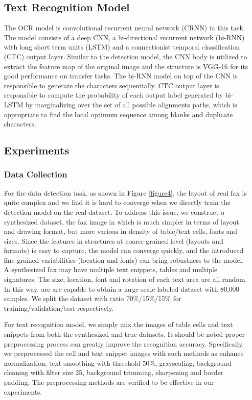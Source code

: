 \documentclass[sigconf]{acmart}
\begin{document}
\subsection{Text Recognition Model}
The OCR model is convolutional recurrent neural network (CRNN) \cite{shi2017end} in this task. The model consists of a deep CNN, a bi-directional recurrent network (bi-RNN) with long short term units (LSTM) and a connectionist temporal classification (CTC) \cite{graves2006connectionist} output layer. Similar to the detection model, the CNN body is utilized to extract the feature map of the original image and the structure is VGG-16 for its good performance on transfer tasks. The bi-RNN model on top of the CNN is responsible to generate the characters sequentially. CTC output layer is responsible to compute the probability of each output label generated by bi-LSTM by marginalizing
over the set of all possible alignments paths, which is appropriate to find the local optimum sequence among blanks and duplicate characters.
\subsection{Experiments}
\subsubsection*{\rm \textbf{Data Collection}}
For the data detection task, as shown in Figure \ref{figure4}, the layout of real fax is quite complex and we find it is hard to converge when we directly train the detection model on the real dataset. To address this issue, we construct a synthesized dataset, the fax image in which is much simpler in terms of layout and drawing format, but more various in density of table/text cells, fonts and sizes. Since the features in structures at coarse-grained level (layouts and formats) is easy to capture, the model can converge quickly, and the introduced fine-grained variabilities (location and fonts) can bring robustness to the model. A synthesized fax may have multiple text snippets, tables and multiple signatures. The size, location, font and rotation of each text area are all random. In this way, are are capable to obtain a large-scale labeled dataset with 80,000 samples. We split the dataset with ratio 70\%/15\%/15\% for training/validation/test respectively. 

For text recognition model, we simply mix the images of table cells and text snippets from both the synthesized and true datasets. It should be noted proper preprocessing process can greatly improve the recognition accuracy. Specifically, we preprocessed the cell and text snippet images with such methods as enhance normalization, text smoothing with threshold 50\%, grayscaling, background cleaning with filter size 25, background trimming, sharpening and border padding. The preprocessing methods are verified to be effective in our experiments.
\end{document}
